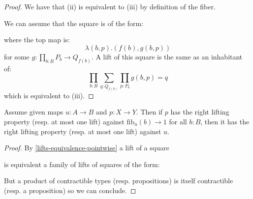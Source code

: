 \begin{proof}
We have that (ii) is equivalent to (iii) by definition of the fiber.

We can assume that the square is of the form:
 \begin{center}
  \end{center}
  where the top map is:
  \[
  \lambda (b,p). (f(b),g(b,p))
  \]
  for some $g:\prod_{b:B} P_b \to Q_{f(b)}$. A lift of this square is the same as an inhabitant of:
  \[
  \prod_{b:B} \sum_{q:Q_{f(b)}} \prod_{p:P_b} g(b,p)=q
  \]
  which is equivalent to (iii).
\end{proof}

\begin{lemma}
Assume given maps $u:A\to B$ and $p:X\to Y$.
Then if $p$ has the right lifting property (resp. at most one lift) against $\mathrm{fib}_u(b)\to 1$ for all $b:B$, then it has the right lifting property (resp. at most one lift) against $u$.
\end{lemma}

\begin{proof}
By \cref{lifts-equivalence-pointwise} a lift of a square
 \begin{center}
  \end{center}
  is equivalent a family of lifts of squares of the form: 
   \begin{center}
  \end{center}
  But a product of contractible types (resp. propositions) is itself contractible (resp. a proposition) so we can conclude. 
\end{proof}

